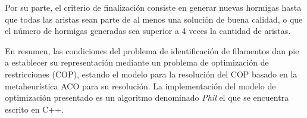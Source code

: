 Por su parte, el criterio de finalizaci\'on consiste en generar nuevas hormigas hasta que todas las aristas sean parte de al menos una soluci\'on de buena calidad, o que el n\'umero de hormigas generadas sea superior a 4 veces la cantidad de aristas.


En resumen, las condiciones del problema de identificaci\'on de filamentos dan pie a establecer su representaci\'on mediante un problema de optimizaci\'on de restricciones (COP), estando el modelo para la resoluci\'on del COP basado en la metaheur\'istica ACO para su resoluci\'on. La implementaci\'on del modelo de optimizaci\'on presentado es un algoritmo denominado {\it Phil} el que se encuentra escrito en C++.